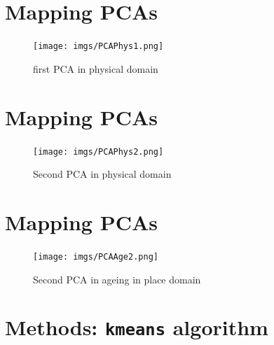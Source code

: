 \documentclass[
  letterpaper,
  DIV=11,
  numbers=noendperiod]{scrartcl}
\begin{document}
\hypertarget{mapping-pcas}{%
\section{Mapping PCAs}\label{mapping-pcas}}

\begin{figure}

{\centering \texttt{[image: imgs/PCAPhys1.png]}

}

\caption{first PCA in physical domain}

\end{figure}

\hypertarget{mapping-pcas-1}{%
\section{Mapping PCAs}\label{mapping-pcas-1}}

\begin{figure}

{\centering \texttt{[image: imgs/PCAPhys2.png]}

}

\caption{Second PCA in physical domain}

\end{figure}

\hypertarget{mapping-pcas-2}{%
\section{Mapping PCAs}\label{mapping-pcas-2}}

\begin{figure}

{\centering \texttt{[image: imgs/PCAAge2.png]}

}

\caption{Second PCA in ageing in place domain}

\end{figure}

\hypertarget{methods-kmeans-algorithm}{%
\section{\texorpdfstring{Methods: \texttt{kmeans}
algorithm}{Methods: kmeans algorithm}}\label{methods-kmeans-algorithm}}
\end{document}
